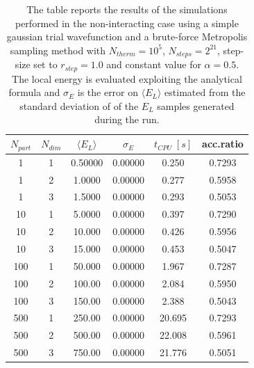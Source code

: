 \begin{table}[H]
    \centering
    \begin{tabular}{cccccc}
    \toprule
    $N_{part}$ & $N_{dim}$ & $\langle E_L \rangle$ & $\sigma_E$ & $t_{CPU}\;[s]$ & acc.ratio \\
    \midrule
    1 & 1 & 0.50000 & 0.00000 & 0.250 & 0.7293 \\
    1 & 2 & 1.0000 & 0.00000 & 0.277 & 0.5958 \\
    1 & 3 & 1.5000 & 0.00000 & 0.293 & 0.5053 \\
    \midrule
    10 & 1 & 5.0000 & 0.00000 & 0.397 & 0.7290 \\
    10 & 2 & 10.000 & 0.00000 & 0.426 & 0.5956 \\
    10 & 3 & 15.000 & 0.00000 & 0.453 & 0.5047 \\
    \midrule
    100 & 1 & 50.000 & 0.00000 & 1.967 & 0.7287 \\
    100 & 2 & 100.00 & 0.00000 & 2.084 & 0.5950 \\
    100 & 3 & 150.00 & 0.00000 & 2.388 & 0.5043 \\
    \midrule
    500 & 1 & 250.00 & 0.00000 & 20.695 & 0.7293 \\
    500 & 2 & 500.00 & 0.00000 & 22.008 & 0.5961 \\
    500 & 3 & 750.00 & 0.00000 & 21.776 & 0.5051 \\
    \bottomrule
    \end{tabular}
    \caption{The table reports the results of the simulations performed in the non-interacting case using a simple gaussian trial wavefunction and a brute-force Metropolis sampling method with $N_{therm}=10^5$, $N_{steps}=2^{21}$, step-size set to $r_{step}=1.0$ and constant value for $\alpha=0.5$. The local energy is evaluated exploiting the analytical formula and $\sigma_E$ is the error on $\langle E_L \rangle$ estimated from the standard deviation of of the $E_L$ samples generated during the run. }
    \label{tab:tab_x_metropolis_analytical}
\end{table}

